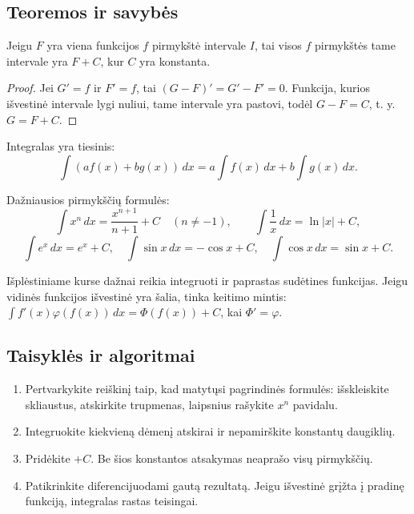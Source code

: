 \subsection{Teoremos ir savybės}
\begin{teorema}
Jeigu \(F\) yra viena funkcijos \(f\) pirmykštė intervale \(I\), tai visos \(f\) pirmykštės tame intervale yra \(F+C\), kur \(C\) yra konstanta.
\end{teorema}
\begin{proof}
Jei \(G'=f\) ir \(F'=f\), tai \((G-F)'=G'-F'=0\). Funkcija, kurios išvestinė intervale lygi nuliui, tame intervale yra pastovi, todėl \(G-F=C\), t. y. \(G=F+C\).
\end{proof}
\begin{savybe}
Integralas yra tiesinis:
\[
\int (a f(x)+b g(x))\,dx=a\int f(x)\,dx+b\int g(x)\,dx.
\]
\end{savybe}
\begin{savybe}
Dažniausios pirmykščių formulės:
\[
\int x^n\,dx=\frac{x^{n+1}}{n+1}+C\quad(n\ne -1),\qquad
\int \frac{1}{x}\,dx=\ln|x|+C,
\]
\[
\int e^x\,dx=e^x+C,\quad
\int \sin x\,dx=-\cos x+C,\quad
\int \cos x\,dx=\sin x+C.
\]
\end{savybe}
\begin{pastaba}
Išplėstiniame kurse dažnai reikia integruoti ir paprastas sudėtines funkcijas. Jeigu vidinės funkcijos išvestinė yra šalia, tinka keitimo mintis: \(\int f'(x)\varphi(f(x))\,dx=\Phi(f(x))+C\), kai \(\Phi'=\varphi\).
\end{pastaba}

\subsection{Taisyklės ir algoritmai}
\begin{enumerate}[label=\arabic*.]
\item Pertvarkykite reiškinį taip, kad matytųsi pagrindinės formulės: išskleiskite skliaustus, atskirkite trupmenas, laipsnius rašykite \(x^n\) pavidalu.
\item Integruokite kiekvieną dėmenį atskirai ir nepamirškite konstantų daugiklių.
\item Pridėkite \(+C\). Be šios konstantos atsakymas neaprašo visų pirmykščių.
\item Patikrinkite diferencijuodami gautą rezultatą. Jeigu išvestinė grįžta į pradinę funkciją, integralas rastas teisingai.
\end{enumerate}


